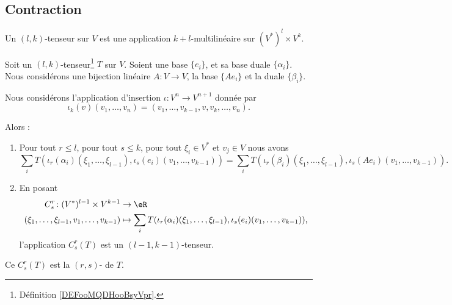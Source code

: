 \subsection{Contraction}

\begin{definition}		\label{DEFooMQDHooBsyVpr}
	Un \( (l,k)\)-tenseur sur \( V\) est une application \( k+l\)-multilinéaire sur \( (V^*)^l\times V^k\).
\end{definition}

\begin{propositionDef}		\label{DEFooIOJMooFtSTtK}
	Soit un \( (l,k)\)-tenseur\footnote{Définition \ref{DEFooMQDHooBsyVpr}.} \( T\) sur \( V\). Soient une base \( \{ e_i \}\), et sa base duale \( \{ \alpha_i \}\). Nous considérons une bijection linéaire \(A \colon V\to V  \), la base \( \{ Ae_i \}\) et la duale \( \{ \beta_i \}\).

	Nous considérons l'application d'insertion \(\iota \colon V^n\to V^{n+1}  \) donnée par
	\begin{equation}
		\iota_k(v)(v_1,\ldots,v_n)=(v_1,\ldots,v_{k-1},v,v_k,\ldots,v_n).
	\end{equation}

	Alors :
	\begin{enumerate}
		\item		\label{ITEMooSROIooGtTXCL}
		      Pour tout \( r\leq l\), pour tout \( s\leq k\), pour tout \( \xi_i\in V^*\) et \( v_j\in V\) nous avons
		      \begin{equation}
			      \sum_i T(   \iota_r(\alpha_i)(\xi_1,\ldots,\xi_{l-1}), \iota_s(e_i)(v_1,\ldots,v_{k-1})   )=
			      \sum_i T(   \iota_r(\beta_i)(\xi_1,\ldots,\xi_{l-1}), \iota_s(Ae_i)(v_1,\ldots,v_{k-1})   ).
		      \end{equation}
		\item		\label{ITEMooPWLBooOYrluK}
		      En posant
		      \begin{equation}
			      \begin{aligned}
				      C_s^r\colon (V^*)^{l-1}\times V^{k-1}       & \to \eR \\
				      (\xi_1,\ldots,\xi_{l-1},v_1,\ldots,v_{k-1}) & \mapsto
				      \sum_i T(   \iota_r(\alpha_i)(\xi_1,\ldots,\xi_{l-1}), \iota_s(e_i)(v_1,\ldots,v_{k-1})   ),
			      \end{aligned}
		      \end{equation}
		      l'application \( C_s^r(T)\) est un \( (l-1, k-1)\)-tenseur.
	\end{enumerate}
	Ce \( C_s^r(T)\) est la \( (r,s)\)- de \( T\).
\end{propositionDef}

